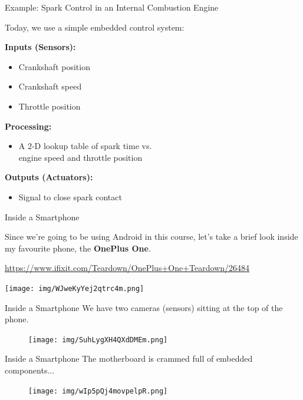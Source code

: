 \documentclass{beamer}
\begin{document}
	\begin{frame}{Example: Spark Control in an Internal Combustion Engine}
	
		Today, we use a simple embedded control system: 
				
		{\bf Inputs (Sensors):}
		\begin{itemize}
			\item Crankshaft position
			\item Crankshaft speed
			\item Throttle position
		\end{itemize}
		
		{\bf Processing:}
		\begin{itemize}
			\item A 2-D lookup table of spark time vs. \\
			engine speed and throttle position
		\end{itemize}
		
		{\bf Outputs (Actuators):}
		\begin{itemize}
			\item Signal to close spark contact
		\end{itemize}
	
	\end{frame}
	
	\begin{frame}{Inside a Smartphone}
		
		Since we're going to be using Android in this course, let's take a brief look
		inside my favourite phone, the {\bf OnePlus One}.
		
		\href{https://www.ifixit.com/Teardown/OnePlus+One+Teardown/26484}{https://www.ifixit.com/Teardown/OnePlus+One+Teardown/26484}
		
		\vspace{1em}		
		
		\centering
		\texttt{[image: img/WJweKyYej2qtrc4m.png]}
			
	\end{frame}
	
	\begin{frame}{Inside a Smartphone}
		We have two cameras (sensors) sitting at the top of the phone.
		\begin{figure}[b]		
		\centering
		\texttt{[image: img/SuhLygXH4QXdDMEm.png]}
		\end{figure}
	\end{frame}
  
	\begin{frame}{Inside a Smartphone}
		The motherboard is crammed full of embedded components...
		\begin{figure}[b]
		\centering
		\texttt{[image: img/wIp5pQj4movpelpR.png]}
		\end{figure}
	\end{frame}  
	
\end{document}
